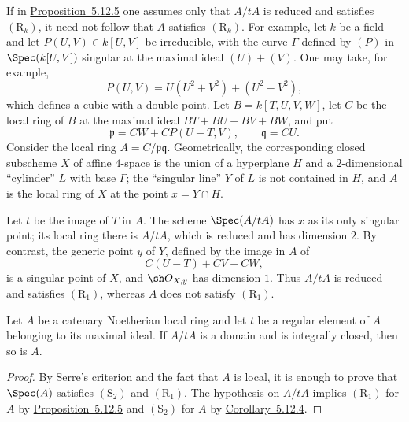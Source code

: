 \begin{remark}[5.12.6]
\label{IV.5.12.6}
If in {\hyperlink{ega4.c04.prop.5-12-5}{Proposition~5.12.5}} one assumes only that $A/tA$ is reduced
and satisfies $(\mathrm R_k)$, it need not follow that $A$
satisfies $(\mathrm R_k)$.  For example, let $k$ be a field and
let $P(U,V)\in k[U,V]$ be irreducible, with the curve $\Gamma$
defined by $(P)$ in $\Spec(k[U,V])$ singular at the maximal ideal
$(U)+(V)$.  One may take, for example,
\[
  P(U,V)=U(U^2+V^2)+(U^2-V^2),
\]
which defines a cubic with a double point.  Let
$B=k[T,U,V,W]$, let $C$ be the local ring of $B$ at the maximal
ideal $BT+BU+BV+BW$, and put
\[
  \mathfrak p=CW+CP(U-T,V),\qquad \mathfrak q=CU.
\]
Consider the local ring $A=C/\mathfrak p\mathfrak q$.
Geometrically, the corresponding closed subscheme $X$ of affine
$4$-space is the union of a hyperplane $H$ and a
$2$-dimensional ``cylinder'' $L$ with base $\Gamma$; the
``singular line'' $Y$ of $L$ is not contained in $H$, and $A$ is
the local ring of $X$ at the point $x=Y\cap H$.

Let $t$ be the image of $T$ in $A$.  The scheme
$\Spec(A/tA)$ has $x$ as its only singular point; its local ring
there is $A/tA$, which is reduced and has dimension $2$.  By
contrast, the generic point $y$ of $Y$, defined by the image in
$A$ of
\[
  C(U-T)+CV+CW,
\]
is a singular point of $X$, and $\sh O_{X,y}$ has dimension $1$.
Thus $A/tA$ is reduced and satisfies $(\mathrm R_1)$, whereas
$A$ does not satisfy $(\mathrm R_1)$.
\end{remark}


\begin{corollary}[5.12.7]
\label{IV.5.12.7}
Let $A$ be a catenary Noetherian local ring and let $t$ be a
regular element of $A$ belonging to its maximal ideal.  If
$A/tA$ is a domain and is integrally closed, then so is $A$.
\end{corollary}

\begin{proof}
By Serre's criterion  and the fact that $A$ is
local, it is enough to prove that $\Spec(A)$ satisfies
$(\mathrm S_2)$ and $(\mathrm R_1)$.  The hypothesis on $A/tA$
implies $(\mathrm R_1)$ for $A$ by {\hyperlink{ega4.c04.prop.5-12-5}{Proposition~5.12.5}} and
$(\mathrm S_2)$ for $A$ by {\hyperlink{ega4.c04.cor.5-12-4}{Corollary~5.12.4}}.
\end{proof}
